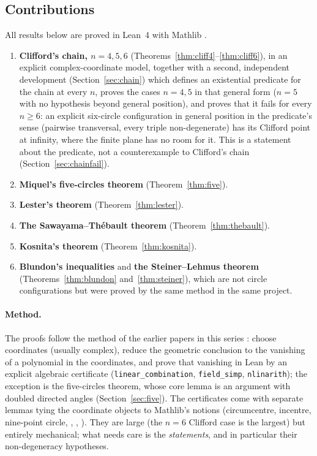 \documentclass[11pt]{article}
\theoremstyle{definition}
\theoremstyle{remark}
\newcommand{\lean}[1]{\texttt{#1}}
\begin{document}
\subsection{Contributions}
All results below are proved in Lean~4 \cite{lean4} with Mathlib \cite{mathlib2020}.
\begin{enumerate}
\item \textbf{Clifford's chain, $n=4,5,6$} (Theorems~\ref{thm:cliff4}--\ref{thm:cliff6}), in an explicit
complex-coordinate model, together with a second, independent development
(Section~\ref{sec:chain}) which defines an existential predicate for the chain at every $n$,
proves the cases $n=4,5$ in that general form ($n=5$ with no hypothesis beyond general position),
and proves that it fails for every $n\ge6$: an explicit six-circle configuration in general position in
the predicate's sense (pairwise transversal, every triple non-degenerate) has
its Clifford point at infinity, where the finite plane has no room for it. This is a statement about the
predicate, not a counterexample to Clifford's chain (Section~\ref{sec:chainfail}).
\item \textbf{Miquel's five-circles theorem} (Theorem~\ref{thm:five}).
\item \textbf{Lester's theorem} (Theorem~\ref{thm:lester}).
\item \textbf{The Sawayama--Th\'ebault theorem} (Theorem~\ref{thm:thebault}).
\item \textbf{Kosnita's theorem} (Theorem~\ref{thm:kosnita}).
\item \textbf{Blundon's inequalities} and \textbf{the Steiner--Lehmus theorem}
(Theorems~\ref{thm:blundon} and~\ref{thm:steiner}), which are not circle configurations but were
proved by the same method in the same project.
\end{enumerate}

\paragraph{Method.} The proofs follow the method of the earlier papers in this series
\cite{paperA,paperB}: choose coordinates (usually complex), reduce the geometric conclusion to the
vanishing of a polynomial in the coordinates, and prove that vanishing in Lean by an explicit
algebraic certificate (\lean{linear\_combination}, \lean{field\_simp}, \lean{nlinarith}); the exception
is the five-circles theorem, whose core lemma is an argument with doubled directed angles
(Section~\ref{sec:five}). The certificates come with
separate lemmas tying the coordinate objects to Mathlib's notions (circumcentre, incentre,
nine-point circle, , , ). They
are large (the $n=6$ Clifford case is the largest) but entirely mechanical; what needs care is the
\emph{statements}, and in particular their non-degeneracy hypotheses.
\end{document}
